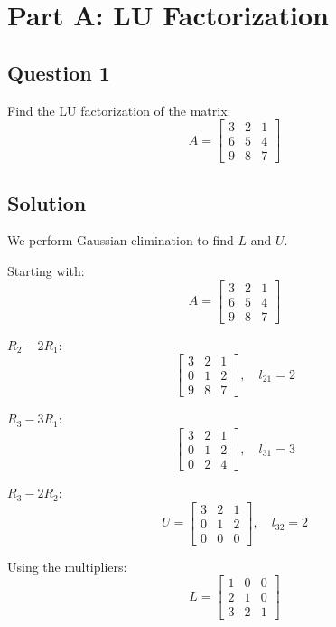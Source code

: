 \documentclass[12pt]{article}
\begin{document}
\section*{Part A: LU Factorization}
\hrulefill
\vspace{1em}

\subsection*{Question 1}
Find the LU factorization of the matrix:
$$
A = \begin{bmatrix}
3 & 2 & 1 \\
6 & 5 & 4 \\
9 & 8 & 7
\end{bmatrix}
$$

\subsection*{Solution}

We perform Gaussian elimination to find $L$ and $U$.

Starting with:
\[
	A = \begin{bmatrix}
		3 & 2 & 1 \\
		6 & 5 & 4 \\
		9 & 8 & 7
	\end{bmatrix}
\]

$R_2 - 2R_1$:
\[
	\begin{bmatrix}
		3 & 2 & 1 \\
		0 & 1 & 2 \\
		9 & 8 & 7
	\end{bmatrix}, \quad l_{21} = 2
\]

$R_3 - 3R_1$:
\[
	\begin{bmatrix}
		3 & 2 & 1 \\
		0 & 1 & 2 \\
		0 & 2 & 4
	\end{bmatrix}, \quad l_{31} = 3
\]

$R_3 - 2R_2$:
\[
	U = \begin{bmatrix}
		3 & 2 & 1 \\
		0 & 1 & 2 \\
		0 & 0 & 0
	\end{bmatrix}, \quad l_{32} = 2
\]

Using the multipliers:
\[
	L = \begin{bmatrix}
		1 & 0 & 0 \\
		2 & 1 & 0 \\
		3 & 2 & 1
	\end{bmatrix}
\]
\end{document}
